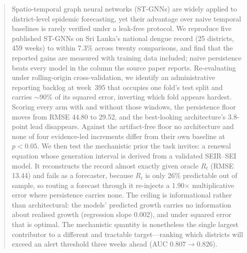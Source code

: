 \begin{abstract}
Spatio-temporal graph neural networks (ST-GNNs) are widely applied to
district-level epidemic forecasting, yet their advantage over naive temporal
baselines is rarely verified under a leak-free protocol. We reproduce five
published ST-GNNs on Sri Lanka's national dengue record (25 districts, 459 weeks)
to within 7.3\% across twenty comparisons, and find that the reported gains are
measured with training data included; naive persistence beats every model in the
column the source paper reports. Re-evaluating under rolling-origin
cross-validation, we identify an administrative reporting backlog at week~395 that
occupies one fold's test split and carries $\sim$90\% of its squared error,
inverting which fold appears hardest. Scoring every arm with and without those
windows, the persistence floor moves from RMSE 44.80 to 29.52, and the
best-looking architecture's 3.8-point lead disappears. Against the artifact-free
floor no architecture and none of four evidence-led increments differ from their
own baseline at $p<0.05$. We then test the mechanistic prior the task invites: a
renewal equation whose generation interval is derived from a validated SEIR--SEI
model. It reconstructs the record almost exactly given oracle $R_t$ (RMSE 13.44)
and fails as a forecaster, because $R_t$ is only 26\% predictable out of sample,
so routing a forecast through it re-injects a 1.90$\times$ multiplicative error
where persistence carries none. The ceiling is informational rather than
architectural: the models' predicted growth carries no information about realised
growth (regression slope 0.002), and under squared error that is optimal. The
mechanistic quantity is nonetheless the single largest contributor to a different
and tractable target---ranking which districts will exceed an alert threshold
three weeks ahead (AUC $0.807 \rightarrow 0.826$).
\end{abstract}
